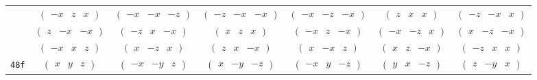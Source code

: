 \documentclass[fleqn,9pt,landscape]{jsarticle}
\begin{document}
\begin{center}
\begin{longtable}{ccccccc}
& $ \begin{pmatrix} - x & z & x \end{pmatrix} $ & $ \begin{pmatrix} - x & - x & - z \end{pmatrix} $ & $ \begin{pmatrix} - z & - x & - x \end{pmatrix} $ & $ \begin{pmatrix} - x & - z & - x \end{pmatrix} $ & $ \begin{pmatrix} z & x & x \end{pmatrix} $ & $ \begin{pmatrix} - z & - x & x \end{pmatrix} $ \\
& $ \begin{pmatrix} z & - x & - x \end{pmatrix} $ & $ \begin{pmatrix} - z & x & - x \end{pmatrix} $ & $ \begin{pmatrix} x & z & x \end{pmatrix} $ & $ \begin{pmatrix} - x & z & - x \end{pmatrix} $ & $ \begin{pmatrix} - x & - z & x \end{pmatrix} $ & $ \begin{pmatrix} x & - z & - x \end{pmatrix} $ \\
& $ \begin{pmatrix} - x & x & z \end{pmatrix} $ & $ \begin{pmatrix} x & - z & x \end{pmatrix} $ & $ \begin{pmatrix} z & x & - x \end{pmatrix} $ & $ \begin{pmatrix} x & - x & z \end{pmatrix} $ & $ \begin{pmatrix} x & z & - x \end{pmatrix} $ & $ \begin{pmatrix} - z & x & x \end{pmatrix} $ \\ \hline
{\tt 48f} & $ \begin{pmatrix} x & y & z \end{pmatrix} $ & $ \begin{pmatrix} - x & - y & z \end{pmatrix} $ & $ \begin{pmatrix} x & - y & - z \end{pmatrix} $ & $ \begin{pmatrix} - x & y & - z \end{pmatrix} $ & $ \begin{pmatrix} y & x & - z \end{pmatrix} $ & $ \begin{pmatrix} z & - y & x \end{pmatrix} $ \\

\end{longtable}
\end{center}
\end{document}
